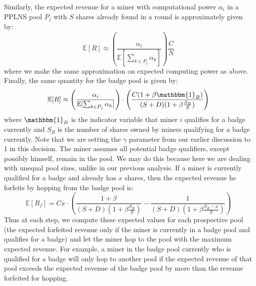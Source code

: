 \documentclass{article}
\theoremstyle{plain}
\theoremstyle{definition}
\begin{document}
Similarly, the expected revenue for a miner with computational power $\alpha_i$ in a PPLNS pool $P_j$ with $S$ shares already found in a round is approximately given by:
\begin{equation*}
\mathbb{E}[R] \approx \left(\frac{\alpha_i}{\mathbb{E}[\sum_{k \in P_j}\alpha_k]} \right) \frac{C}{N}
\end{equation*}
where we make the same approximation on expected computing power as above. Finally, the same quantity for the badge pool is given by:
\begin{equation*}
\mathbb{E}[R] \approx \left(\frac{\alpha_i}{\mathbb{E}[\sum_{k \in P_j}\alpha_k]} \right) \cdot \left(\frac{C(1+\beta \mathbbm{1}_B)}{(S+D)(1+\beta \frac{S_B}{S})} \right)
\end{equation*}
where $\mathbbm{1}_B$ is the indicator variable that miner $i$ qualifies for a badge currently and $S_B$ is the number of shares owned by miners qualifying for a badge currently. Note that we are setting the $\gamma$ parameter from our earlier discussion to 1 in this decision. The miner assumes all potential badge qualifiers, except possibly himself, remain in the pool. We may do this because here we are dealing with unequal pool sizes, unlike in our previous analysis. If a miner is currently qualified for a badge and already has $x$ shares, then the expected revenue he forfeits by hopping from the badge pool is:
\begin{equation*}
\mathbb{E}[R_f] = C x \cdot \left(\frac{1+\beta}{(S+D)(1+\beta \frac{S_B}{S})} -\frac{1}{(S+D)(1+\beta \frac{S_B-x}{S})}\right)
\end{equation*}
Thus at each step, we compute these expected values for each prospective pool (the expected forfeited revenue only if the miner is currently in a badge pool and qualifies for a badge) and let the miner hop to the pool with the maximum expected revenue. For example, a miner in the badge pool currently who is qualified for a badge will only hop to another pool if the expected revenue of that pool exceeds the expected revenue of the badge pool by more than the revenue forfeited for hopping.
\end{document}
